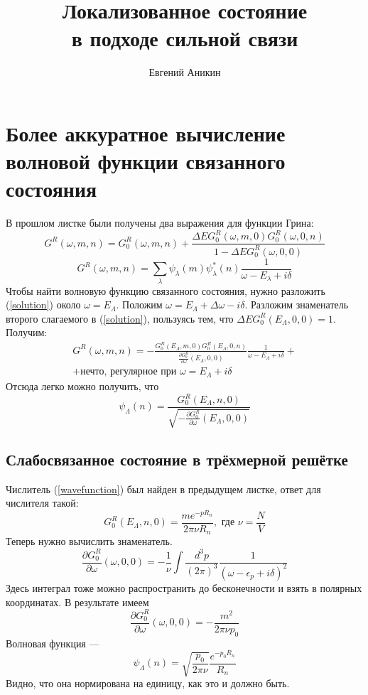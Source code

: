 \documentclass{article}
\title{Локализованное состояние\\ в подходе сильной связи}
\author{Евгений Аникин}
\begin{document}
\maketitle
\section{Более аккуратное вычисление волновой функции связанного состояния}
В прошлом листке были получены два выражения для функции Грина:
\begin{equation}
	\label{solution}
	G^R(\omega, m,n) = G^R_0(\omega, m,n) + 
		\frac{\Delta EG^R_0(\omega, m,0)G^R_0(\omega, 0, n)}{1 - \Delta E G^R_0(\omega,0,0)}
\end{equation}
\begin{equation}
	\label{general}
	G^R(\omega, m,n) = \sum_\lambda \psi_\lambda(m)\psi_\lambda^{*}(n) 
			\frac{1}{\omega - E_\lambda + i\delta}
\end{equation}
Чтобы найти волновую функцию связанного состояния, нужно разложить (\ref{solution}) около
$\omega = E_\Lambda$. Положим $\omega = E_\Lambda + \Delta \omega - i\delta$.
Разложим знаменатель второго слагаемого в (\ref{solution}), пользуясь тем, что
$\Delta E G_0^R(E_\Lambda, 0,0) = 1$. Получим:
\begin{multline}
	G^R(\omega, m,n) = -\frac{G^R_0(E_\Lambda, m,0)G^R_0(E_\Lambda, 0,n)}
						{\frac{\partial G^R_0}{\partial \omega} (E_\Lambda,0,0)}
							\frac{1}{\omega - E_\Lambda + i\delta} + \\
						+ \mbox{нечто, регулярное при } \omega = E_\Lambda + i\delta
\end{multline}
Отсюда легко можно получить, что
\begin{equation}
	\label{wavefunction}
	\psi_\Lambda(n) = \frac{G_0^R(E_\Lambda, n,0)}
					{\sqrt{-\frac{\partial G_0^R}{\partial \omega}(E_\Lambda, 0,0)}}
\end{equation}

\subsection{Слабосвязанное состояние в трёхмерной решётке}
Числитель (\ref{wavefunction}) был найден в предыдущем листке, ответ для числителя такой:
\begin{equation}
	G_0^R(E_\Lambda, n,0) = \frac{m e^{-pR_n}}{2\pi \nu R_n},
		\text{ где } \nu = \frac{N}{V}
\end{equation}
Теперь нужно вычислить знаменатель.
\begin{equation}
	\frac{\partial G_0^R}{\partial \omega}(\omega, 0, 0) = -\frac{1}{\nu} 
		\int \frac{d^3 p}{(2\pi)^3} \frac{1}{(\omega - \epsilon_p + i\delta)^2}
\end{equation}
Здесь интеграл тоже можно распространить до бесконечности и взять в полярных координатах.
В результате имеем
\begin{equation}
	\frac{\partial G_0^R}{\partial \omega}(\omega, 0, 0) = -\frac{m^2}{2\pi\nu p_0}
\end{equation}
Волновая функция --- 
\begin{equation}
	\psi_\Lambda(n) = \sqrt{\frac{p_0}{2\pi \nu}} \frac{e^{-p_0 R_n}}{R_n}
\end{equation}
Видно, что она нормирована на единицу, как это и должно быть.
\end{document}
